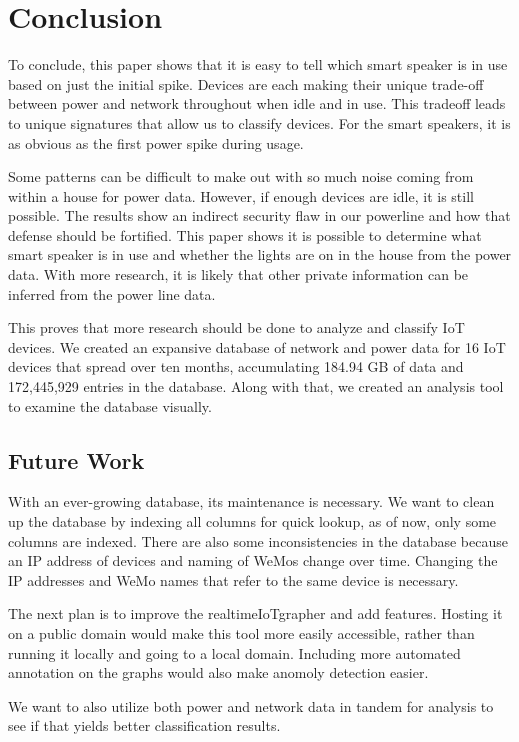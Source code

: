 \chapter{Conclusion}
\label{Conclusion}

To conclude, this paper shows that it is easy to tell which smart speaker is in use based on just the initial spike. Devices are each making their unique trade-off between power and network throughout when idle and in use. This tradeoff leads to unique signatures that allow us to classify devices. For the smart speakers, it is as obvious as the first power spike during usage.

Some patterns can be difficult to make out with so much noise coming from within a house for power data. However, if enough devices are idle, it is still possible. The results show an indirect security flaw in our powerline and how that defense should be fortified. This paper shows it is possible to determine what smart speaker is in use and whether the lights are on in the house from the power data. With more research, it is likely that other private information can be inferred from the power line data.

This proves that more research should be done to analyze and classify IoT devices. We created an expansive database of network and power data for 16 IoT devices that spread over ten months, accumulating 184.94 GB of data and 172,445,929 entries in the database. Along with that, we created an analysis tool to examine the database visually.

\section{Future Work}

With an ever-growing database, its maintenance is necessary. We want to clean up the database by indexing all columns for quick lookup, as of now, only some columns are indexed. There are also some inconsistencies in the database because an IP address of devices and naming of WeMos change over time. Changing the IP addresses and WeMo names that refer to the same device is necessary.

The next plan is to improve the realtimeIoTgrapher and add features. Hosting it on a public domain would make this tool more easily accessible, rather than running it locally and going to a local domain. Including more automated annotation on the graphs would also make anomoly detection easier.

We want to also utilize both power and network data in tandem for analysis to see if that yields better classification results.

